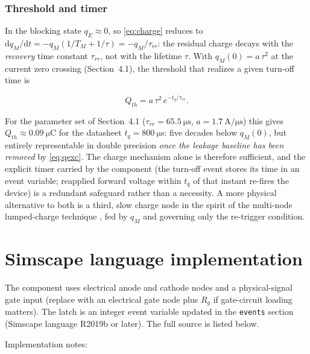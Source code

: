 \documentclass[11pt,a4paper]{article}
\begin{document}
\subsubsection*{Threshold and timer}

In the blocking state $q_E \approx 0$, so \eqref{eq:charge} reduces to
$\mathrm{d}q_M/\mathrm{d}t = -q_M(1/T_M + 1/\tau) = -q_M/\tau_{rr}$: the
residual charge decays with the \emph{recovery} time constant $\tau_{rr}$,
not with the lifetime $\tau$. With $q_M(0) = a\,\tau^2$ at the current zero
crossing (Section~4.1), the threshold that realizes a given turn-off time is

\begin{equation}
  Q_{th} = a\,\tau^2 \, e^{-t_q/\tau_{rr}}.
  \label{eq:tq}
\end{equation}

For the parameter set of Section~4.1 ($\tau_{rr} = \SI{65.5}{\micro\second}$,
$a = \SI{1.7}{\ampere\per\micro\second}$) this gives
$Q_{th} \approx \SI{0.09}{\micro\coulomb}$ for the datasheet
$t_q = \SI{800}{\micro\second}$: five decades below $q_M(0)$, but entirely
representable in double precision \emph{once the leakage baseline has been
removed} by \eqref{eq:qexc}. The charge mechanism alone is therefore
sufficient, and the explicit timer carried by the component (the turn-off
event stores its time in an event variable; reapplied forward voltage within
$t_q$ of that instant re-fires the device) is a redundant safeguard rather
than a necessity. A more physical alternative to both is a third, slow
charge node in the spirit of the multi-node lumped-charge technique
\cite{ma1997}, fed by $q_M$ and governing only the re-trigger condition.

\section{Simscape language implementation}

The component uses electrical anode and cathode nodes and a physical-signal
gate input (replace with an electrical gate node plus $R_g$ if gate-circuit
loading matters). The latch is an integer event variable updated in the
\texttt{events} section (Simscape language R2019b or later). The full source
is listed below. 



Implementation notes:
\end{document}

